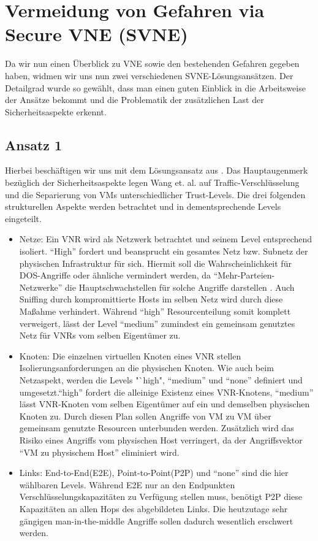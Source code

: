 \documentclass{lni}
\begin{document}
\section{Vermeidung von Gefahren via Secure VNE (SVNE)}
\label{sec:svne}
Da wir nun einen Überblick zu VNE sowie den bestehenden Gefahren gegeben haben, widmen wir uns nun zwei verschiedenen SVNE-Lösungsansätzen. Der Detailgrad wurde so gewählt, dass man einen guten Einblick in die Arbeitsweise der Ansätze bekommt und die Problematik der zusätzlichen Last der Sicherheitsaspekte erkennt.

\subsection{Ansatz 1}

Hierbei beschäftigen wir uns mit dem Lösungsansatz aus \cite{wang2016towards}. 
Das Hauptaugenmerk bezüglich der Sicherheitsaspekte legen Wang et. al. auf Traffic-Verschlüsselung und die Separierung von VMs unterschiedlicher Trust-Levels. Die drei folgenden strukturellen Aspekte werden betrachtet und in dementsprechende Levels eingeteilt.
\begin{itemize}
\item Netze:\newline
Ein VNR wird als Netzwerk betrachtet und seinem Level entsprechend isoliert. "`High"' fordert und beansprucht ein gesamtes Netz bzw. Subnetz der physischen Infrastruktur für sich. Hiermit soll die Wahrscheinlichkeit für DOS-Angriffe oder ähnliche vermindert werden, da "`Mehr-Parteien-Netzwerke"' die Hauptschwachstellen für solche Angriffe darstellen \cite{DOS}. Auch Sniffing durch kompromittierte Hosts im selben Netz wird durch diese Maßahme verhindert. Während "`high"' Resourcenteilung somit komplett verweigert, lässt der Level "`medium"' zumindest ein gemeinsam genutztes Netz für VNRs vom selben Eigentümer zu.

\item Knoten:\newline
Die einzelnen virtuellen Knoten eines VNR stellen Isolierungsanforderungen an die physischen Knoten. Wie auch beim Netzaspekt, werden die Levels "`high", "`medium"' und "`none"' definiert und umgesetzt."`high"' fordert die alleinige Existenz eines VNR-Knotens, "`medium"' lässt VNR-Knoten vom selben Eigentümer auf ein und demselben physischen Knoten zu. Durch diesen Plan sollen Angriffe von VM zu VM über gemeinsam genutzte Resourcen unterbunden werden. Zusätzlich wird das Risiko eines Angriffs vom physischen Host verringert, da der Angriffsvektor "`VM zu physischem Host"' eliminiert wird.

\item Links:\newline
End-to-End(E2E), Point-to-Point(P2P) und "`none"' sind die hier wählbaren Levels. Während E2E nur an den Endpunkten Verschlüsselungskapazitäten zu Verfügung stellen muss, benötigt P2P diese Kapazitäten an allen Hops des abgebildeten Links. Die heutzutage sehr gängigen man-in-the-middle Angriffe sollen dadurch wesentlich erschwert werden. 
\end{itemize}
\end{document}
